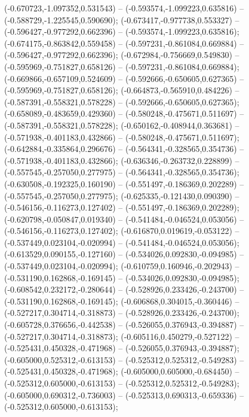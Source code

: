  (-0.670723,-1.097352,0.531543) -- (-0.593574,-1.099223,0.635816) -- (-0.588729,-1.225545,0.590690);
 (-0.673417,-0.977738,0.553327) -- (-0.596427,-0.977292,0.662396) -- (-0.593574,-1.099223,0.635816);
 (-0.674175,-0.863842,0.559458) -- (-0.597231,-0.861084,0.669884) -- (-0.596427,-0.977292,0.662396);
 (-0.672984,-0.756669,0.549830) -- (-0.595969,-0.751827,0.658126) -- (-0.597231,-0.861084,0.669884);
 (-0.669866,-0.657109,0.524609) -- (-0.592666,-0.650605,0.627365) -- (-0.595969,-0.751827,0.658126);
 (-0.664873,-0.565910,0.484226) -- (-0.587391,-0.558321,0.578228) -- (-0.592666,-0.650605,0.627365);
 (-0.658089,-0.483659,0.429360) -- (-0.580248,-0.475671,0.511697) -- (-0.587391,-0.558321,0.578228);
 (-0.650162,-0.408944,0.363681) -- (-0.571938,-0.401183,0.432866) -- (-0.580248,-0.475671,0.511697);
 (-0.642884,-0.335864,0.296676) -- (-0.564341,-0.328565,0.354736) -- (-0.571938,-0.401183,0.432866);
 (-0.636346,-0.263732,0.228899) -- (-0.557545,-0.257050,0.277975) -- (-0.564341,-0.328565,0.354736);
 (-0.630508,-0.192325,0.160190) -- (-0.551497,-0.186369,0.202289) -- (-0.557545,-0.257050,0.277975);
 (-0.625335,-0.121430,0.090390) -- (-0.546156,-0.116273,0.127402) -- (-0.551497,-0.186369,0.202289);
 (-0.620798,-0.050847,0.019340) -- (-0.541484,-0.046524,0.053056) -- (-0.546156,-0.116273,0.127402);
 (-0.616870,0.019619,-0.053122) -- (-0.537449,0.023104,-0.020994) -- (-0.541484,-0.046524,0.053056);
 (-0.613529,0.090155,-0.127160) -- (-0.534026,0.092830,-0.094985) -- (-0.537449,0.023104,-0.020994);
 (-0.610759,0.160946,-0.202943) -- (-0.531190,0.162868,-0.169145) -- (-0.534026,0.092830,-0.094985);
 (-0.608542,0.232172,-0.280644) -- (-0.528926,0.233426,-0.243700) -- (-0.531190,0.162868,-0.169145);
 (-0.606868,0.304015,-0.360446) -- (-0.527217,0.304714,-0.318873) -- (-0.528926,0.233426,-0.243700);
 (-0.605728,0.376656,-0.442538) -- (-0.526055,0.376943,-0.394887) -- (-0.527217,0.304714,-0.318873);
 (-0.605116,0.450279,-0.527122) -- (-0.525431,0.450328,-0.471968) -- (-0.526055,0.376943,-0.394887);
 (-0.605000,0.525312,-0.613153) -- (-0.525312,0.525312,-0.549283) -- (-0.525431,0.450328,-0.471968);
 (-0.605000,0.605000,-0.684450) -- (-0.525312,0.605000,-0.613153) -- (-0.525312,0.525312,-0.549283);
 (-0.605000,0.690312,-0.736003) -- (-0.525313,0.690313,-0.659336) -- (-0.525312,0.605000,-0.613153);
